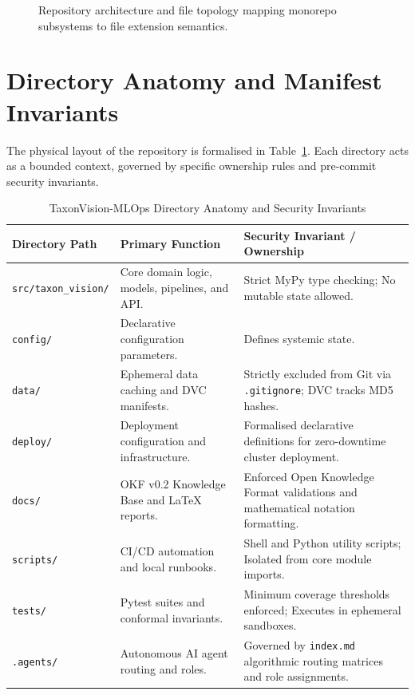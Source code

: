 \begin{figure}[htbp]
    \centering
    
    \caption{Repository architecture and file topology mapping monorepo subsystems to file extension semantics.}
    \label{fig:repo_topology}
\end{figure}

\section{Directory Anatomy and Manifest Invariants}
\label{sec:directory_anatomy}

The physical layout of the repository is formalised in Table~\ref{tab:directory_anatomy}. Each directory acts as a bounded context, governed by specific ownership rules and pre-commit security invariants.

\begin{table}[htbp]
\centering
\caption{TaxonVision-MLOps Directory Anatomy and Security Invariants}
\label{tab:directory_anatomy}
\begin{tabularx}{\textwidth}{@{}l l X@{}}
\toprule
\textbf{Directory Path} & \textbf{Primary Function} & \textbf{Security Invariant / Ownership} \\
\midrule
\texttt{src/taxon\_vision/} & Core domain logic, models, pipelines, and API. & Strict MyPy type checking; No mutable state allowed. \\
\texttt{config/} & Declarative configuration parameters. & Defines systemic state. \\
\texttt{data/} & Ephemeral data caching and DVC manifests. & Strictly excluded from Git via \texttt{.gitignore}; DVC tracks MD5 hashes. \\
\texttt{deploy/} & Deployment configuration and infrastructure. & Formalised declarative definitions for zero-downtime cluster deployment. \\
\texttt{docs/} & OKF v0.2 Knowledge Base and LaTeX reports. & Enforced Open Knowledge Format validations and mathematical notation formatting. \\
\texttt{scripts/} & CI/CD automation and local runbooks. & Shell and Python utility scripts; Isolated from core module imports. \\
\texttt{tests/} & Pytest suites and conformal invariants. & Minimum coverage thresholds enforced; Executes in ephemeral sandboxes. \\
\texttt{.agents/} & Autonomous AI agent routing and roles. & Governed by \texttt{index.md} algorithmic routing matrices and role assignments. \\
\bottomrule
\end{tabularx}
\end{table}


